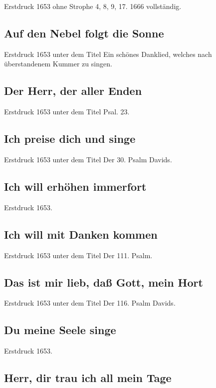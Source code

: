Erstdruck 1653 ohne Strophe 4, 8, 9, 17. 1666 vollständig.

\subsection*{ Auf den Nebel folgt die Sonne}

Erstdruck 1653 unter dem Titel \frqq Ein schönes Danklied, welches nach
überstandenem Kummer zu singen\flqq .

\subsection*{ Der Herr, der aller Enden}

Erstdruck 1653 unter dem Titel \frqq Psal. 23\flqq .

\subsection*{ Ich preise dich und singe}

Erstdruck 1653 unter dem Titel \frqq Der 30. Psalm Davids\flqq .

\subsection*{ Ich will erhöhen immerfort}

Erstdruck 1653.

\subsection*{ Ich will mit Danken kommen}

Erstdruck 1653 unter dem Titel \frqq Der 111. Psalm\flqq .

\subsection*{ Das ist mir lieb, daß Gott, mein Hort}

Erstdruck 1653 unter dem Titel \frqq Der 116. Psalm Davids\flqq .

\subsection*{ Du meine Seele singe}

Erstdruck 1653.

\subsection*{ Herr, dir trau ich all mein Tage}

